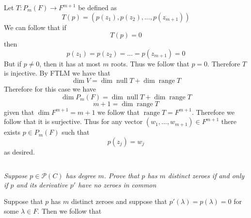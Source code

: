 \documentclass[11pt,oneside,titlepage]{book}
\DeclareMathOperator \ns {null}
\DeclareMathOperator \range {range}
\begin{document}
Let $T: P_m(F) \to F^{m + 1}$ be defined as
$$T(p) = (p(z_1), p(z_2), ..., p(z_{m + 1}))$$
We can follow that if
$$T(p) = 0$$
then
$$p(z_1) = p(z_2) = ... = p(z_{m + 1}) = 0$$
But if $p \neq 0$, then it has at most $m$ roots. Thus we follow that $p = 0$. Therefore $T$ is
injective. By FTLM we have that
$$\dim V = \dim \ns T + \dim \range T$$
Therefore for this case we have
$$\dim P_m(F) = \dim \ns T + \dim \range T$$
$$m + 1 =  \dim \range T$$
given that $\dim F^{m + 1} = m + 1$ we follow that $\range T = F^{m + 1}$. Therefore we
follow that it is surjective. Thus for any vector $(w_1, ..., w_{m + 1}) \in F^{m + 1}$
there exists $p \in P_m(F)$ such that
$$p(z_j) = w_j$$
as desired.

\subsection{}

\textit{Suppose $p \in \mathcal P(C)$ has degree $m$. Prove that $p$ has $m$ distinct zeroes if
  and only if $p$ and its derivative $p'$ have no zeroes in common}

Suppose that $p$ has $m$ distinct zeroes and suppose that $p'(\lambda) = p(\lambda) = 0$ for
some $\lambda \in F$. Then we follow that
\end{document}
